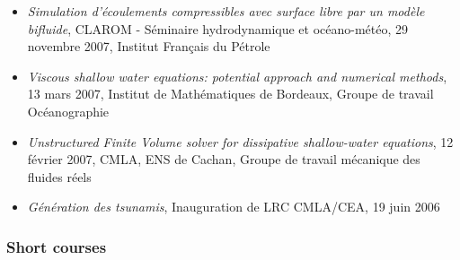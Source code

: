 \documentclass[final, a4paper, oneside, 12pt]{article}
\numberwithin{equation}{section}
\begin{document}
\begin{itemize}
  \item \textit{Simulation d'\'ecoulements compressibles avec surface libre par un mod\`ele bifluide}, CLAROM - S\'eminaire hydrodynamique et oc\'eano-m\'et\'eo, 29 novembre 2007, Institut Fran\c{c}ais du P\'etrole
  
  \item \textit{Viscous shallow water equations: potential approach and numerical methods}, 13 mars 2007, Institut de Math\'ematiques de Bordeaux, Groupe de travail Oc\'eanographie
  
  \item \textit{Unstructured Finite Volume solver for dissipative shallow-water equations}, 12 f\'evrier 2007, CMLA, ENS de Cachan, Groupe de travail m\'ecanique des fluides r\'eels
  
  \item \textit{G\'en\'eration des tsunamis}, Inauguration de LRC CMLA/CEA, 19 juin 2006
  
\end{itemize}

\subsubsection{Short courses}
\end{document}
